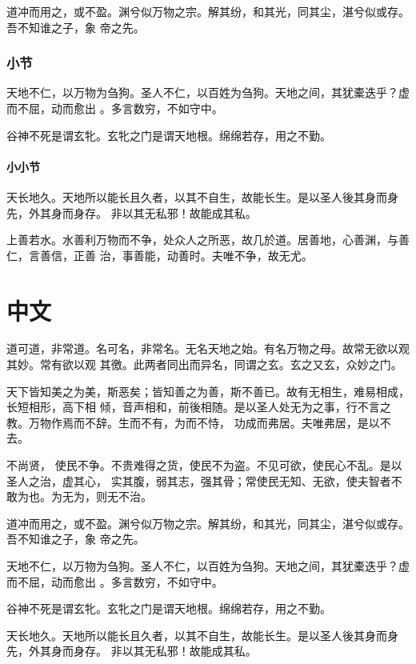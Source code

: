 \documentclass[a4paper, twoside, openany, extrafontsizes]{dlutthesis}
\begin{document}
道冲而用之，或不盈。渊兮似万物之宗。解其纷，和其光，同其尘，湛兮似或存。吾不知谁之子，象
帝之先。

\subsection{小节}
\label{sub:subsection}

天地不仁，以万物为刍狗。圣人不仁，以百姓为刍狗。天地之间，其犹橐迭乎？虚而不屈，动而愈出
。多言数穷，不如守中。

谷神不死是谓玄牝。玄牝之门是谓天地根。绵绵若存，用之不勤。

\subsubsection{小小节}
\label{subs:subsubsection}

天长地久。天地所以能长且久者，以其不自生，故能长生。是以圣人後其身而身先，外其身而身存。
非以其无私邪！故能成其私。

上善若水。水善利万物而不争，处众人之所恶，故几於道。居善地，心善渊，与善仁，言善信，正善
治，事善能，动善时。夫唯不争，故无尤。


\chapter{中文} %

道可道，非常道。名可名，非常名。无名天地之始。有名万物之母。故常无欲以观其妙。常有欲以观
其徼。此两者同出而异名，同谓之玄。玄之又玄，众妙之门。

天下皆知美之为美，斯恶矣；皆知善之为善，斯不善已。故有无相生，难易相成，长短相形，高下相
倾，音声相和，前後相随。是以圣人处无为之事，行不言之教。万物作焉而不辞。生而不有，为而不恃，
功成而弗居。夫唯弗居，是以不去。

不尚贤， 使民不争。不贵难得之货，使民不为盗。不见可欲，使民心不乱。是以圣人之治，虚其心，
实其腹，弱其志，强其骨；常使民无知、无欲，使夫智者不敢为也。为无为，则无不治。

道冲而用之，或不盈。渊兮似万物之宗。解其纷，和其光，同其尘，湛兮似或存。吾不知谁之子，象
帝之先。

天地不仁，以万物为刍狗。圣人不仁，以百姓为刍狗。天地之间，其犹橐迭乎？虚而不屈，动而愈出
。多言数穷，不如守中。

谷神不死是谓玄牝。玄牝之门是谓天地根。绵绵若存，用之不勤。

天长地久。天地所以能长且久者，以其不自生，故能长生。是以圣人後其身而身先，外其身而身存。
非以其无私邪！故能成其私。
\end{document}
